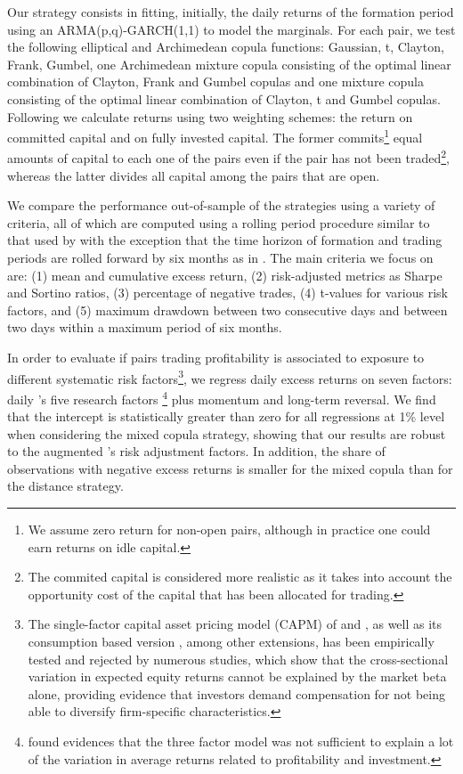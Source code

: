 \documentclass[a4paper]{article}
\begin{document}
 Our strategy consists in fitting, initially, the daily returns of the formation period using an ARMA(p,q)-GARCH(1,1) to model the marginals. For each pair, we test the following elliptical and Archimedean copula functions: Gaussian, t, Clayton, Frank, Gumbel, one Archimedean mixture copula consisting of the optimal linear combination of Clayton, Frank and Gumbel copulas and one mixture copula consisting of the optimal linear combination of Clayton, t and Gumbel copulas. Following \citet*{ggr06} we calculate returns using two weighting schemes: the return on committed capital and on fully invested capital. The former commits\footnote{We assume zero return for non-open pairs, although in practice one could earn returns on idle capital.} equal amounts of capital to each one of the pairs even if the pair has not been traded\footnote{The commited capital is considered more realistic as it takes into account the opportunity cost of the capital that has been allocated for trading.}, whereas the latter divides all capital among the pairs that are open.
	
We compare the performance out-of-sample of the strategies using a variety of criteria, all of which are computed using a rolling period procedure similar to that used by \citet*{ggr06} with the exception that the time horizon of formation and trading periods are rolled forward by six months as in \citet*{bv12}. The main criteria we focus on are: (1) mean and cumulative excess return, (2) risk-adjusted metrics as Sharpe and Sortino ratios, (3) percentage of negative trades, (4) t-values for various risk factors, and (5) maximum drawdown between two consecutive days and between two days within a maximum period of six months.

	In order to evaluate if pairs trading profitability is associated to exposure to different systematic risk factors\footnote{The single-factor capital asset pricing model (CAPM) of \citet*{s64} and \citet*{l65}, as well as its consumption based version \citep{b79}, among other extensions, has been empirically tested and rejected by numerous studies, which show that the cross-sectional variation in expected equity returns cannot be explained by the market beta alone, providing evidence that investors demand compensation for not being able to diversify firm-specific characteristics.}, we regress daily excess returns on seven factors: daily \citet*{ff15}'s five research factors \footnote{\citet*{ff15} found evidences that the three factor model was not sufficient to explain a lot of the variation in average returns related to profitability and investment.} plus momentum and long-term reversal. We find that the intercept is statistically greater than zero for all regressions at 1\% level when considering the mixed copula strategy, showing that our results are robust to the augmented \citet*{ff15}'s risk adjustment factors. In addition, the share of observations with negative excess returns is smaller for the mixed copula than for the distance strategy.
	
\end{document}
